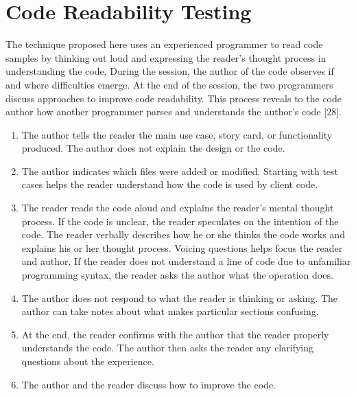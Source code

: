 \documentclass[conference]{IEEEtran}
\begin{document}
\section{Code Readability Testing}
The technique proposed here uses an experienced programmer to read code samples by thinking out loud and expressing the reader’s thought process in understanding the code. During the session, the author of the code observes if and where difficulties emerge. At the end of the session, the two programmers discuss approaches to improve code readability. This process reveals to the code author how another programmer parses and understands the author’s code [28].
\begin{enumerate}
  \item The author tells the reader the main use case, story card, or functionality produced. The author does not explain the design or the code.
  \item The author indicates which files were added or modified. Starting with test cases helps the reader understand how the code is used by client code.
  \item The reader reads the code aloud and explains the reader’s mental thought process. If the code is unclear, the reader speculates on the intention of the code. The reader verbally describes how he or she thinks the code works and explains his or her thought process. Voicing questions helps focus the reader and author. If the reader does not understand a line of code due to unfamiliar programming syntax, the reader asks the author what the operation does.
  \item The author does not respond to what the reader is thinking or asking. The author can take notes about what makes particular sections confusing.
  \item At the end, the reader confirms with the author that the reader properly understands the code. The author then asks the reader any clarifying questions about the experience.
  \item The author and the reader discuss how to improve the code.
\end{enumerate}
\end{document}
